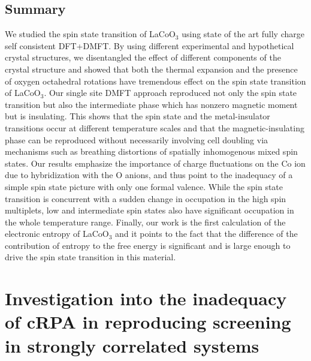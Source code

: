 \documentclass[10pt]{ruthesis}
\begin{document}
{\section{Summary} 
We studied the spin state transition of LaCoO$_3$ using state of the art fully charge self consistent DFT+DMFT. By using different experimental and hypothetical crystal structures, we disentangled the effect of different components of the crystal structure and showed that both the thermal expansion and the presence of oxygen octahedral rotations have tremendous effect on the spin state transition of LaCoO$_3$. Our single site DMFT approach reproduced not only the spin state transition but also the intermediate phase which has nonzero magnetic moment but is insulating. This shows that the spin state and the metal-insulator transitions occur at different temperature scales and that the magnetic-insulating phase can be reproduced without  necessarily involving cell doubling via mechanisms such as breathing distortions of spatially inhomogenous mixed spin states. Our results emphasize the importance of charge fluctuations on the Co ion due to hybridization with the O anions, and thus point to the inadequacy of a simple spin state picture with only one formal valence. While the spin state transition is concurrent with a sudden change in occupation in the high spin multiplets, low and intermediate spin states also have significant occupation in the whole temperature range. Finally, our work is the first calculation of the electronic entropy of LaCoO$_3$ and it points to the fact that the difference of the contribution of entropy to the free energy is significant and is large enough to drive the spin state transition in this material. 

\pagebreak
\chapter{Investigation into the inadequacy of cRPA in reproducing screening in strongly correlated systems}
}
\end{document}
